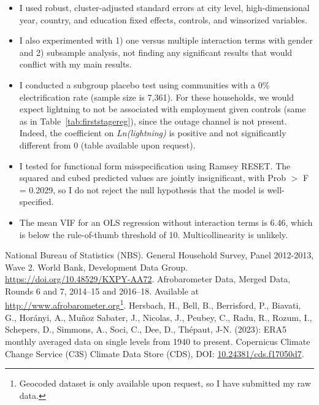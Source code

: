 \documentclass[12pt]{article}
\begin{document}
\begin{itemize}
\item I used robust, cluster-adjusted standard errors at city level, high-dimensional year, country, and education fixed effects, controls, and winsorized variables. 
\item  I also experimented with 1) one versus multiple interaction terms with gender and 2) subsample analysis, not finding any significant results that would conflict with my main results.
    \item I conducted a subgroup placebo test using communities with a 0\% electrification rate (sample size is 7,361). For these households, we would expect lightning to not be associated with employment given controls (same as in Table~\ref{tab:firststagereg}), since the outage channel is not present. Indeed, the coefficient on \textit{Ln(lightning)} is positive and not significantly different from 0 (table available upon request).
        \item I tested for functional form misspecification using Ramsey RESET. The squared and cubed predicted values are jointly insignificant, with Prob $>$ F = 0.2029, so I do not reject the null hypothesis that the model is well-specified.
    \item The mean VIF for an OLS regression without interaction terms is 6.46, which is below the rule-of-thumb threshold of 10. Multicollinearity is unlikely.
\end{itemize}

\newpage
\renewcommand\refname{Data Sources}
\begin{thebibliography}{9}

National Bureau of Statistics (NBS). General Household Survey, Panel  2012-2013, Wave 2. World Bank, Development Data Group. \href{https://doi.org/10.48529/KXPY-AA72}{https://doi.org/10.48529/KXPY-AA72}.
Afrobarometer Data, Merged Data, Rounds 6 and 7, 2014–15 and 2016–18. Available at \url{http://www.afrobarometer.org}\footnote{Geocoded dataset is only available upon request, so I have submitted my raw data.}.
Hersbach, H., Bell, B., Berrisford, P., Biavati, G., Horányi, A., Muñoz Sabater, J., Nicolas, J., Peubey, C., Radu, R., Rozum, I., Schepers, D., Simmons, A., Soci, C., Dee, D., Thépaut, J-N. (2023): ERA5 monthly averaged data on single levels from 1940 to present. Copernicus Climate Change Service (C3S) Climate Data Store (CDS), DOI: \href{https://doi.org/10.24381/cds.f17050d7}{10.24381/cds.f17050d7}.
\end{thebibliography}
\nocite{*}
\renewcommand\refname{References}

\end{document}
